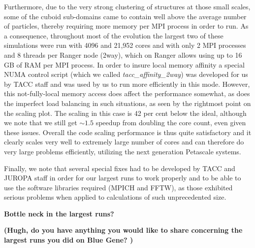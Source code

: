 Furthermore, due to the very strong clustering of structures at those small 
scales, some of the cuboid sub-domains came to contain well above the 
average number of particles, thereby requiring more memory per {\small MPI} process
in order to run. As a consequence, throughout most of the evolution the 
largest two of these simulations were run with 4096 and 21,952 cores and 
with only 2 {\small MPI} processes and 8 threads per Ranger node (2way), which on 
Ranger allows using up to 16 GB of RAM per {\small MPI }process. In order to insure 
local memory affinity a special NUMA control script (which we called {\it 
tacc\_affinity\_2way}) 
was developed for us by TACC staff and was used by us to run more efficiently 
in this mode. However, this not-fully-local memory access does affect the 
performance somewhat, as does the imperfect load balancing in such situations,
as seen by the rightmost point on the scaling plot. The scaling in this case
is 42 per cent below the ideal, although we note that we still get $\sim1.5$ speedup
from doubling the core count, even given these issues. Overall the
code scaling performance is thus quite satisfactory and it clearly 
scales very well to extremely large number of cores and can therefore 
do very large problems efficiently, utilizing the next generation 
Petascale systems. 

Finally, we note that several special fixes had to be developed by TACC 
and JUROPA staff in order for our largest runs to work properly and to be 
able to use the software libraries required ({\small MPICH} and {\small FFTW}), as those 
exhibited serious problems when applied to calculations of such 
unprecedented size. 

{\bf Bottle neck in the largest runs?}

{\bf (Hugh, do you have anything you would like to share 
concerning the largest runs you did on Blue Gene? )} 
